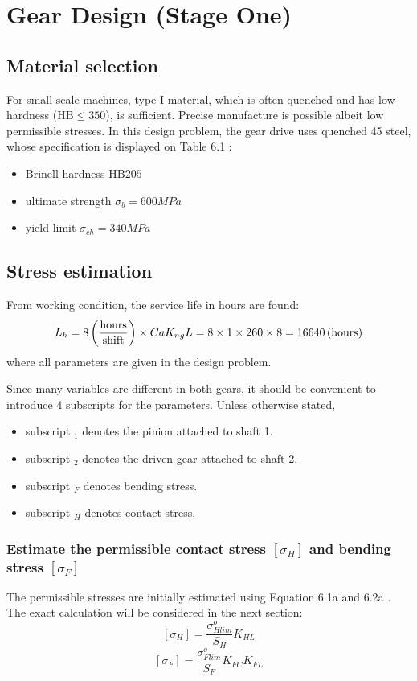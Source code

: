 \chapter{Gear Design (Stage One)}

\section{Material selection}
For small scale machines, type I material, which is often quenched and has low hardness ($ \text{HB}\leq 350 $), is sufficient. Precise manufacture is possible albeit low permissible stresses. In this design problem, the gear drive uses quenched 45 steel, whose specification is displayed on Table 6.1 \cite{tk1}:
\begin{itemize}
	\item Brinell hardness $ \text{HB} 205 $
	\item ultimate strength $ \sigma_b = 600\unit{MPa} $
	\item yield limit $ \sigma_{ch} = 340 \unit{MPa}$
\end{itemize}

\section{Stress estimation}
From working condition, the service life in hours are found:
\[L_h = 8\, \mathrm{\left( \dfrac{hours}{shift}\right)}\times Ca  K_{ng} L= 8 \times 1\times 260\times 8 = 16640\, (\mathrm{hours})\]
where all parameters are given in the design problem.

Since many variables are different in both gears, it should be convenient to introduce 4 subscripts for the parameters. Unless otherwise stated,
\begin{itemize}
	\item subscript $ _1 $ denotes the pinion attached to shaft 1.
	\item subscript $ _2 $ denotes the driven gear attached to shaft 2.
	\item subscript $ _F $ denotes bending stress.
	\item subscript $ _H $ denotes contact stress.
\end{itemize}
\subsection{Estimate the permissible contact stress $ [\sigma_H] $ and bending stress $ [\sigma_F] $}
The permissible stresses are initially estimated using Equation 6.1a and 6.2a \cite{tk1}. The exact calculation will be considered in the next section:
\[[\sigma_H]=\dfrac{\sigma_{Hlim}^o}{S_H}K_{HL}\]
\[[\sigma_F]=\dfrac{\sigma_{Flim}^o}{S_F}K_{FC}K_{FL}\]


